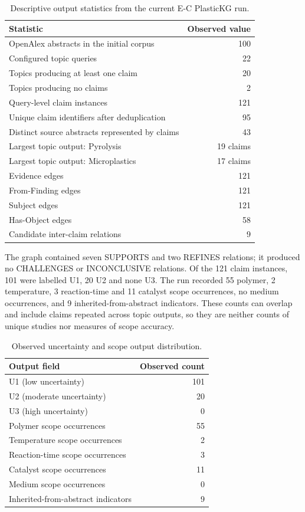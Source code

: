 \documentclass[11pt,a4paper]{article}
\begin{document}
\begin{table}[htbp]
\centering
\caption{Descriptive output statistics from the current E-C PlasticKG run.}
\label{tab:graphstats}
\small
\begin{tabularx}{\linewidth}{>{\raggedright\arraybackslash}Xr}
\toprule
\textbf{Statistic} & \textbf{Observed value}\\
\midrule
OpenAlex abstracts in the initial corpus & 100\\
Configured topic queries & 22\\
Topics producing at least one claim & 20\\
Topics producing no claims & 2\\
Query-level claim instances & 121\\
Unique claim identifiers after deduplication & 95\\
Distinct source abstracts represented by claims & 43\\
Largest topic output: Pyrolysis & 19 claims\\
Largest topic output: Microplastics & 17 claims\\
Evidence edges & 121\\
From-Finding edges & 121\\
Subject edges & 121\\
Has-Object edges & 58\\
Candidate inter-claim relations & 9\\
\bottomrule
\end{tabularx}
\end{table}

The graph contained seven SUPPORTS and two REFINES relations; it produced no CHALLENGES or INCONCLUSIVE relations. Of the 121 claim instances, 101 were labelled U1, 20 U2 and none U3. The run recorded 55 polymer, 2 temperature, 3 reaction-time and 11 catalyst scope occurrences, no medium occurrences, and 9 inherited-from-abstract indicators. These counts can overlap and include claims repeated across topic outputs, so they are neither counts of unique studies nor measures of scope accuracy.

\begin{table}[htbp]
\centering
\caption{Observed uncertainty and scope output distribution.}
\label{tab:scopeuncertainty}
\small
\begin{tabularx}{\linewidth}{>{\raggedright\arraybackslash}Xr}
\toprule
\textbf{Output field} & \textbf{Observed count}\\
\midrule
U1 (low uncertainty) & 101\\
U2 (moderate uncertainty) & 20\\
U3 (high uncertainty) & 0\\
Polymer scope occurrences & 55\\
Temperature scope occurrences & 2\\
Reaction-time scope occurrences & 3\\
Catalyst scope occurrences & 11\\
Medium scope occurrences & 0\\
Inherited-from-abstract indicators & 9\\
\bottomrule
\end{tabularx}
\end{table}
\end{document}
